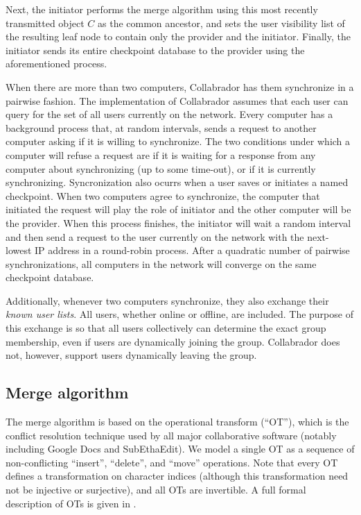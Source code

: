 \documentclass[11pt,titlepage]{article}
\begin{document}
Next, the initiator performs the merge algorithm using this most
recently transmitted object $C$ as the common ancestor, and sets the
user visibility list of the resulting leaf node to contain only the
provider and the initiator. Finally, the initiator sends its entire
checkpoint database to the provider using the aforementioned process.

When there are more than two computers, Collabrador has them
synchronize in a pairwise fashion. The implementation of Collabrador
assumes that each user can query for the set of all users currently on
the network. Every computer has a background process that, at random
intervals, sends a request to another computer asking if it is willing
to synchronize.  The two conditions under which a computer will refuse
a request are if it is waiting for a response from any computer about
synchronizing (up to some time-out), or if it is currently
synchronizing. Syncronization also ocurrs when a user saves or initiates
a named checkpoint. When two computers agree to synchronize, the computer
that initiated the request will play the role of initiator and the
other computer will be the provider. When this process finishes, the
initiator will wait a random interval and then send a request to
the user currently on the network with the next-lowest IP address in a
round-robin process. After a quadratic number of pairwise
synchronizations, all computers in the network will converge on the
same checkpoint database.

Additionally, whenever two computers synchronize, they also exchange
their \emph{known user lists}. All users, whether online or offline,
are included. The purpose of this exchange is so that all users
collectively can determine the exact group membership, even if users
are dynamically joining the group. Collabrador does not, however,
support users dynamically leaving the group.

\subsection{Merge algorithm}
\label{sec:merge}

The merge algorithm is based on the operational transform (``OT''),
which is the conflict resolution technique used by all major
collaborative software (notably including Google Docs and
SubEthaEdit).  We model a single OT as a sequence of non-conflicting
``insert'', ``delete'', and ``move'' operations.  Note that every OT
defines a transformation on character indices (although this
transformation need not be injective or surjective), and all OTs are
invertible.  A full formal description of OTs is given in \cite{wave}.
\end{document}
